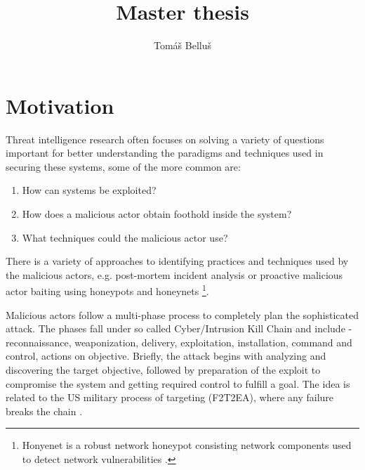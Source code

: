 \documentclass[12pt,a4paper,twoside]{report}
\title{Master thesis}
\author{Tomáš Belluš}
\begin{document}
	







\begingroup
\color{black}
\tableofcontents
\endgroup


\chapter{Motivation}\label{motivation}

Threat intelligence research often focuses on solving a variety of questions important for better understanding the paradigms and techniques used in securing these systems, some of the more common are:
\begin{enumerate}
	\item How can systems be exploited?
	\item How does a malicious actor obtain foothold inside the system?
	\item What techniques could the malicious actor use?
\end{enumerate}

There is a variety of approaches to identifying practices and techniques used by the malicious actors, e.g. post-mortem incident analysis \cite{research:blog:post-mortem} or proactive malicious actor baiting using honeypots and honeynets \footnote{Honyenet is a robust network honeypot consisting network components used to detect network vulnerabilities \cite{research:web:honeynet}.}.


 
Malicious actors follow a multi-phase process \cite{research:seven-phases} \cite{research:seven-phases2} to completely plan the sophisticated attack. The phases fall under so called Cyber/Intrusion Kill Chain and include - reconnaissance, weaponization, delivery, exploitation, installation, command and control, actions on objective. Briefly, the attack begins with analyzing and discovering the target objective, followed by preparation of the exploit to compromise the system and getting required control to fulfill a goal. The idea is related to the US military process of targeting (F2T2EA), where any failure breaks the chain \cite{research:paper:kill-chain}. 
\end{document}
